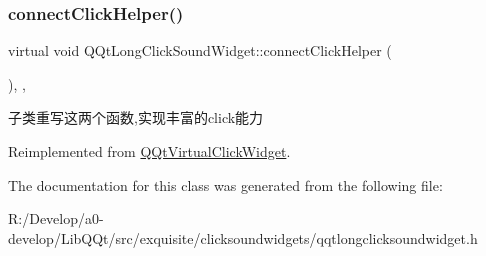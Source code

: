 \subsubsection{\texorpdfstring{connect\+Click\+Helper()}{connectClickHelper()}}
{\footnotesize\ttfamily virtual void Q\+Qt\+Long\+Click\+Sound\+Widget\+::connect\+Click\+Helper (\begin{DoxyParamCaption}{ }\end{DoxyParamCaption})\hspace{0.3cm}{\ttfamily [inline]}, {\ttfamily [protected]}, {\ttfamily [virtual]}}

子类重写这两个函数,实现丰富的click能力 

Reimplemented from \mbox{\hyperlink{class_q_qt_virtual_click_widget_a2e9874c5ec5aba763426dcacb012d7a7}{Q\+Qt\+Virtual\+Click\+Widget}}.



The documentation for this class was generated from the following file\+:\begin{DoxyCompactItemize}
\item 
R\+:/\+Develop/a0-\/develop/\+Lib\+Q\+Qt/src/exquisite/clicksoundwidgets/qqtlongclicksoundwidget.\+h\end{DoxyCompactItemize}
